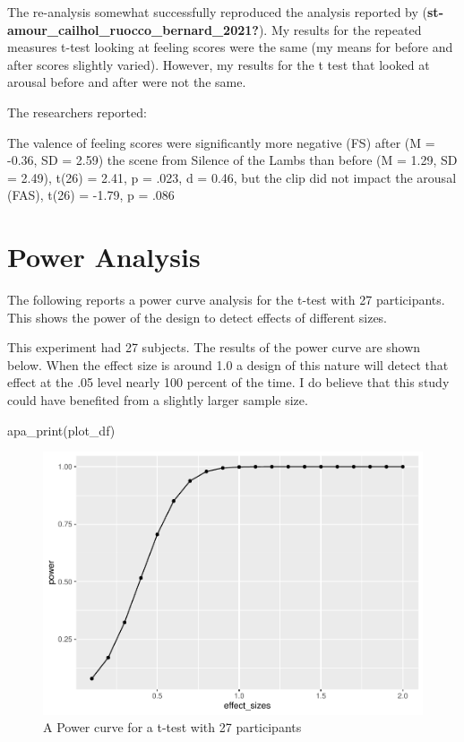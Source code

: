 \documentclass[
  english,
  man]{apa6}
\begin{document}
The re-analysis somewhat successfully reproduced the analysis reported by (\textbf{st-amour\_cailhol\_ruocco\_bernard\_2021?}). My results for the repeated measures t-test looking at feeling scores were the same (my means for before and after scores slightly varied). However, my results for the t test that looked at arousal before and after were not the same.

The researchers reported:

The valence of feeling scores were significantly more negative (FS) after (M = -0.36, SD = 2.59)
the scene from Silence of the Lambs than before (M = 1.29, SD = 2.49), t(26) = 2.41, p = .023, d =
0.46, but the clip did not impact the arousal (FAS), t(26) = -1.79, p = .086

\hypertarget{power-analysis}{%
\section{Power Analysis}\label{power-analysis}}

The following reports a power curve analysis for the t-test with 27 participants. This shows the power of the design to detect effects of different sizes.

This experiment had 27 subjects. The results of the power curve are shown below. When the effect size is around 1.0 a design of this nature will detect that effect at the .05 level nearly 100 percent of the time. I do believe that this study could have benefited from a slightly larger sample size.

apa\_print(plot\_df)

\begin{figure}
\centering
\includegraphics{APAReport_files/figure-latex/unnamed-chunk-2-1.pdf}
\caption{\label{fig:unnamed-chunk-2}A Power curve for a t-test with 27 participants}
\end{figure}
\end{document}
